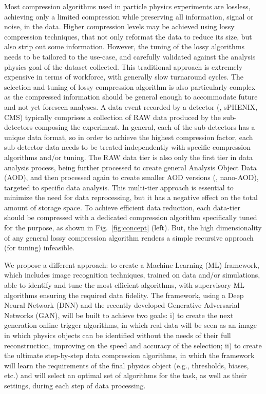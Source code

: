  Most compression algorithms used in particle physics experiments are lossless, achieving only a limited compression while preserving all information, signal or noise, in the data.  Higher compression levels may be achieved using lossy compression techniques, that not only reformat the data to reduce its size, but also strip out some information. However, the tuning of the lossy algorithms needs to be tailored to the use-case, and carefully validated against the analysis physics goal of the dataset collected. This traditional approach is extremely expensive in terms of workforce, with generally slow turnaround cycles. The selection and tuning of lossy compression algorithm is also particularly complex as the compressed information should be general enough to accommodate future and not yet foreseen analyses. A data event recorded by a detector (\eg, sPHENIX, CMS) typically comprises a collection of RAW data produced by the sub-detectors composing the experiment. In general, each of the sub-detectors has a unique data format, so in order to achieve the highest compression factor, each sub-detector data needs to be treated independently with specific compression algorithms and/or tuning. The RAW data tier is also only the first tier in data analysis process, being further processed to create general Analysis Object Data (AOD), and then processed again to create smaller AOD versions (\eg, nano-AOD), targeted to specific data analysis. This multi-tier approach is essential to minimize the need for data reprocessing, but it has a negative effect on the total amount of storage space. To achieve efficient data reduction, each data-tier should be compressed with a dedicated compression algorithm specifically tuned for the purpose, as shown in Fig.~\ref{fig:concept} (left). But, the high dimensionality of any general lossy compression algorithm renders a simple recursive approach (for tuning) infeasible. 

We propose a different approach: to create a Machine Learning (ML) framework, which includes image recognition techniques, trained on data and/or simulations, able to identify and tune the most efficient algorithms, with supervisory ML algorithms ensuring the required data fidelity. The framework, using a Deep Neural Network (DNN) and the recently developed Generative Adversarial Networks (GAN), will be built to achieve two goals: i) to create the next generation online trigger algorithms, in which real data will be seen as an image in which physics objects can be identified without the needs of their full reconstruction, improving on the speed and accuracy of the selection; ii) to create the ultimate step-by-step data compression algorithms, in which the framework will learn the requirements of the final physics object (e.g., thresholds, biases, etc.) and will select an optimal set of algorithms for the task, as well as their settings, during each step of data processing. 

